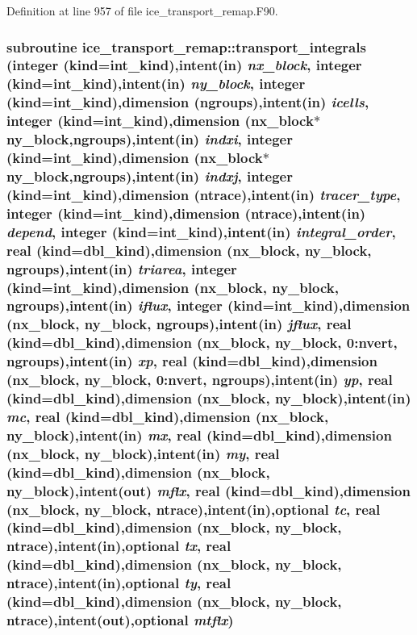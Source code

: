 Definition at line 957 of file ice\_\-transport\_\-remap.F90.\hypertarget{namespaceice__transport__remap_a36c63f1390ec491939f47e64dab35e1e}{
\subsubsection[{transport\_\-integrals}]{\setlength{\rightskip}{0pt plus 5cm}subroutine ice\_\-transport\_\-remap::transport\_\-integrals (integer (kind=int\_\-kind),intent(in) {\em nx\_\-block}, \/  integer (kind=int\_\-kind),intent(in) {\em ny\_\-block}, \/  integer (kind=int\_\-kind),dimension (ngroups),intent(in) {\em icells}, \/  integer (kind=int\_\-kind),dimension (nx\_\-block$\ast$ny\_\-block,ngroups),intent(in) {\em indxi}, \/  integer (kind=int\_\-kind),dimension (nx\_\-block$\ast$ny\_\-block,ngroups),intent(in) {\em indxj}, \/  integer (kind=int\_\-kind),dimension (ntrace),intent(in) {\em tracer\_\-type}, \/  integer (kind=int\_\-kind),dimension (ntrace),intent(in) {\em depend}, \/  integer (kind=int\_\-kind),intent(in) {\em integral\_\-order}, \/  real (kind=dbl\_\-kind),dimension (nx\_\-block, ny\_\-block, ngroups),intent(in) {\em triarea}, \/  integer (kind=int\_\-kind),dimension (nx\_\-block, ny\_\-block, ngroups),intent(in) {\em iflux}, \/  integer (kind=int\_\-kind),dimension (nx\_\-block, ny\_\-block, ngroups),intent(in) {\em jflux}, \/  real (kind=dbl\_\-kind),dimension (nx\_\-block, ny\_\-block, 0:nvert, ngroups),intent(in) {\em xp}, \/  real (kind=dbl\_\-kind),dimension (nx\_\-block, ny\_\-block, 0:nvert, ngroups),intent(in) {\em yp}, \/  real (kind=dbl\_\-kind),dimension (nx\_\-block, ny\_\-block),intent(in) {\em mc}, \/  real (kind=dbl\_\-kind),dimension (nx\_\-block, ny\_\-block),intent(in) {\em mx}, \/  real (kind=dbl\_\-kind),dimension (nx\_\-block, ny\_\-block),intent(in) {\em my}, \/  real (kind=dbl\_\-kind),dimension (nx\_\-block, ny\_\-block),intent(out) {\em mflx}, \/  real (kind=dbl\_\-kind),dimension (nx\_\-block, ny\_\-block, ntrace),intent(in),optional {\em tc}, \/  real (kind=dbl\_\-kind),dimension (nx\_\-block, ny\_\-block, ntrace),intent(in),optional {\em tx}, \/  real (kind=dbl\_\-kind),dimension (nx\_\-block, ny\_\-block, ntrace),intent(in),optional {\em ty}, \/  real (kind=dbl\_\-kind),dimension (nx\_\-block, ny\_\-block, ntrace),intent(out),optional {\em mtflx})}}
\label{namespaceice__transport__remap_a36c63f1390ec491939f47e64dab35e1e}


